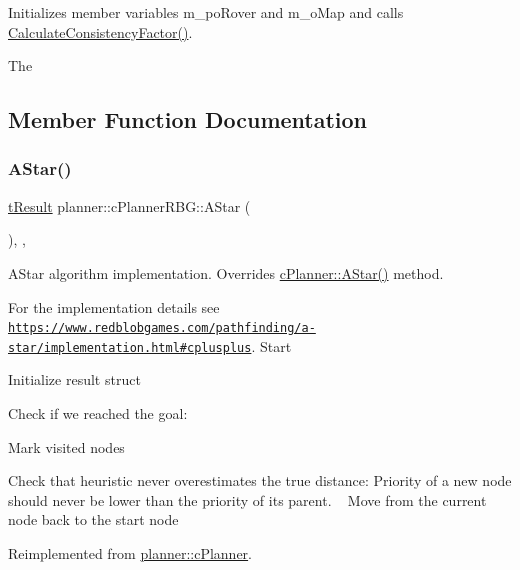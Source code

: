 Initializes member variables m\+\_\+po\+Rover and m\+\_\+o\+Map and calls \mbox{\hyperlink{classplanner_1_1c_planner_a2e5a745f83f903662eff914d8beddb5e}{Calculate\+Consistency\+Factor()}}. 

The 

\subsection{Member Function Documentation}
\mbox{\label{classplanner_1_1c_planner_r_b_g_affd7011ef4df878a8e95ecf7f42c8e6f}} 
\subsubsection{\texorpdfstring{A\+Star()}{AStar()}}
{\footnotesize\ttfamily \mbox{\hyperlink{structt_result}{t\+Result}} planner\+::c\+Planner\+R\+B\+G\+::\+A\+Star (\begin{DoxyParamCaption}{ }\end{DoxyParamCaption})\hspace{0.3cm}{\ttfamily [override]}, {\ttfamily [protected]}, {\ttfamily [virtual]}}



A\+Star algorithm implementation. Overrides \mbox{\hyperlink{classplanner_1_1c_planner_a341e70531266f023ac9461d18979d1ef}{c\+Planner\+::\+A\+Star()}} method. 

For the implementation details see \href{https://www.redblobgames.com/pathfinding/a-star/implementation.html#cplusplus}{\tt https\+://www.\+redblobgames.\+com/pathfinding/a-\/star/implementation.\+html\#cplusplus}. Start

Initialize result struct

Check if we reached the goal\+:

Mark visited nodes

Check that heuristic never overestimates the true distance\+: Priority of a new node should never be lower than the priority of its parent. ~\newline
 Move from the current node back to the start node 

Reimplemented from \mbox{\hyperlink{classplanner_1_1c_planner_a341e70531266f023ac9461d18979d1ef}{planner\+::c\+Planner}}.

\mbox{\label{classplanner_1_1c_planner_r_b_g_a0bbd752702da582a47dbd153c0065eb5}} 
